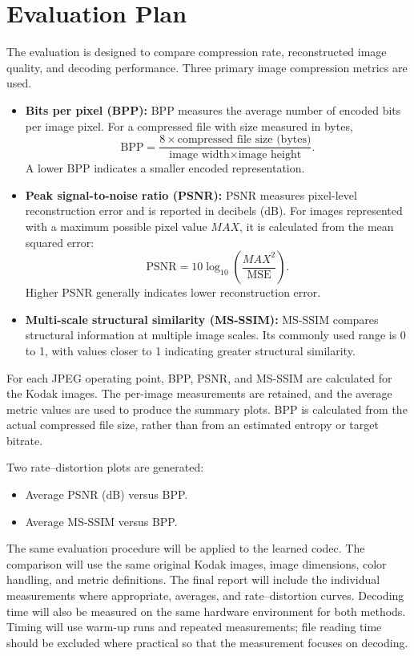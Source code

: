 \documentclass[11pt]{article}
\begin{document}
\section{Evaluation Plan}

The evaluation is designed to compare compression rate, reconstructed
image quality, and decoding performance. Three primary image
compression metrics are used.

\begin{itemize}[leftmargin=*]
    \item \textbf{Bits per pixel (BPP):}
    BPP measures the average number of encoded bits per image pixel.
    For a compressed file with size measured in bytes,
    \[
        \mathrm{BPP} =
        \frac{8 \times \text{compressed file size (bytes)}}
             {\text{image width} \times \text{image height}}.
    \]
    A lower BPP indicates a smaller encoded representation.

    \item \textbf{Peak signal-to-noise ratio (PSNR):}
    PSNR measures pixel-level reconstruction error and is reported
    in decibels (dB). For images represented with a maximum possible
    pixel value $MAX$, it is calculated from the mean squared error:
    \[
        \mathrm{PSNR} =
        10\log_{10}\left(\frac{MAX^2}{\mathrm{MSE}}\right).
    \]
    Higher PSNR generally indicates lower reconstruction error.

    \item \textbf{Multi-scale structural similarity (MS-SSIM):}
    MS-SSIM compares structural information at multiple image scales.
    Its commonly used range is 0 to 1, with values closer to 1
    indicating greater structural similarity.
\end{itemize}

For each JPEG operating point, BPP, PSNR, and MS-SSIM are calculated
for the Kodak images. The per-image measurements are retained, and
the average metric values are used to produce the summary plots.
BPP is calculated from the actual compressed file size, rather than
from an estimated entropy or target bitrate.

Two rate--distortion plots are generated:
\begin{itemize}[leftmargin=*]
    \item Average PSNR (dB) versus BPP.
    \item Average MS-SSIM versus BPP.
\end{itemize}

The same evaluation procedure will be applied to the learned codec.
The comparison will use the same original Kodak images, image
dimensions, color handling, and metric definitions. The final report
will include the individual measurements where appropriate, averages,
and rate--distortion curves. Decoding time will also be measured on
the same hardware environment for both methods. Timing will use
warm-up runs and repeated measurements; file reading time should be
excluded where practical so that the measurement focuses on decoding.
\end{document}
